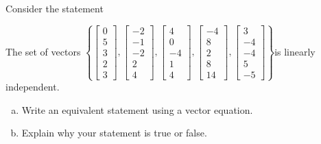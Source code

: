 
\begin{exerciseStatement}


Consider the statement 
\begin{center}\begin{minipage}{0.8\textwidth}
 The set of vectors \( \left\{ \left[\begin{array}{c}
0 \\
5 \\
3 \\
2 \\
3
\end{array}\right] , \left[\begin{array}{c}
-2 \\
-1 \\
-2 \\
2 \\
4
\end{array}\right] , \left[\begin{array}{c}
4 \\
0 \\
-4 \\
1 \\
4
\end{array}\right] , \left[\begin{array}{c}
-4 \\
8 \\
2 \\
8 \\
14
\end{array}\right] , \left[\begin{array}{c}
3 \\
-4 \\
-4 \\
5 \\
-5
\end{array}\right] \right\} \)is linearly independent.
\end{minipage}\end{center}
    


\begin{enumerate}[(a)]
\item  Write an equivalent statement using a vector equation.
\item  Explain why your statement is true or false.
\end{enumerate}
    
\end{exerciseStatement}
    
